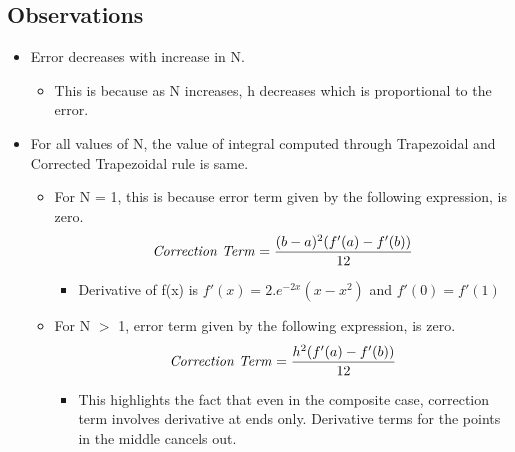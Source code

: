 \documentclass[12pt]{article}
\begin{document}
\subsection{Observations}
\begin{itemize}
	  \item Error decreases with increase in N.
  	\begin{itemize}
  		\item This is because as N increases, h decreases which is proportional to the error.
  	\end{itemize}
	\item For all values of N, the value of integral computed through Trapezoidal and Corrected Trapezoidal rule is same.
	\begin{itemize}
		\item For N = 1, this is because error term given by the following expression, is zero.
			 $$ \text {\textit{Correction Term}} =\frac{(b-a)^2 (f'(a)-f'(b))}{12} $$
		\begin{itemize}
		 \item Derivative of f(x) is $f'(x) = 2.e^{-2x} (x - x^2)$ and $f'(0) = f'(1)$
		\end{itemize}
		\item For N $>$ 1, error term given by the following expression, is zero.		 			$$ \text {\textit{Correction Term}} =\frac{h^2 (f'(a)-f'(b))}{12} $$
		\begin{itemize}
		\item This highlights the fact that even in the composite case, correction term involves derivative at ends only. Derivative terms for the points in the middle cancels out. 
		\end{itemize}
		
	\end{itemize}
\end{itemize}

\clearpage
\section{}
\end{document}
